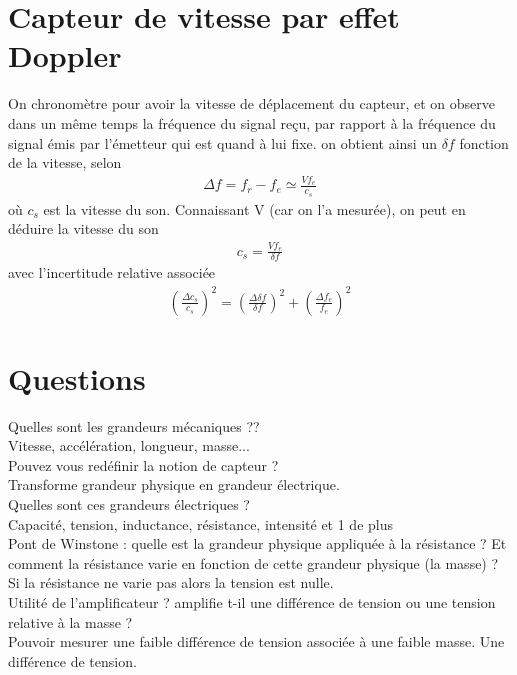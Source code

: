 \documentclass[12pt,prb,aps,epsf]{report}
\begin{document}
\section{Capteur de vitesse par effet Doppler}
On chronomètre pour avoir la vitesse de déplacement du capteur, et on observe dans un même temps la fréquence du signal reçu, par rapport à la fréquence du signal  émis par l'émetteur qui est quand à lui fixe. on obtient ainsi un $\delta f$ fonction de la vitesse, selon 
\begin{eqnarray}
\Delta f = f_r-f_e \simeq \frac{Vf_e}{c_s}
\end{eqnarray} 
où $c_s$ est la vitesse du son. Connaissant V (car on l'a mesurée), on peut en déduire la vitesse du son 
\begin{eqnarray}
c_s = \frac{Vf_e}{\delta f}
\end{eqnarray}
avec l'incertitude relative associée 
\begin{eqnarray}
\left(\frac{\Delta c_s}{c_s}\right)^2 = \left(\frac{\Delta \delta f}{\delta f}\right)^2 + \left(\frac{\Delta f_e}{f_e}\right)^2
\end{eqnarray}




\section{Questions}
Quelles sont les grandeurs mécaniques ??\\
Vitesse, accélération, longueur, masse...\\

Pouvez vous redéfinir la notion de capteur ?\\
Transforme grandeur physique en grandeur électrique.\\

Quelles sont ces grandeurs électriques ?\\
Capacité, tension, inductance, résistance, intensité et 1 de plus\\

Pont de Winstone : quelle est la grandeur physique appliquée à la résistance ? Et comment la résistance varie en fonction de cette grandeur physique (la masse) ?\\
Si la résistance ne varie pas alors la tension est nulle.\\

Utilité de l'amplificateur ? amplifie t-il une différence de tension ou une tension relative à la masse ?\\
Pouvoir mesurer une faible différence de tension associée à une faible masse. Une différence de tension.\\
\end{document}
